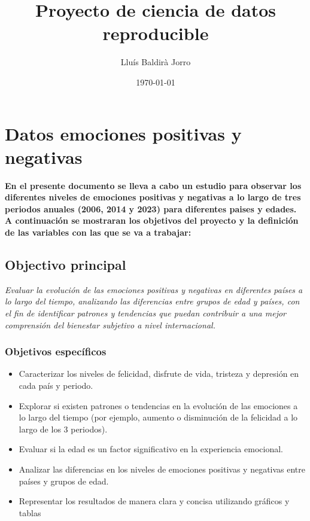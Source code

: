 \documentclass{article}
\title{Proyecto de ciencia de datos reproducible}
\author{Lluís Baldirà Jorro}
\date{\today}
\begin{document}



\maketitle

\section*{Datos emociones positivas y negativas}
\textbf{En el presente documento se lleva a cabo un estudio para observar los diferentes niveles de emociones positivas y negativas a lo largo de tres periodos anuales (2006, 2014 y 2023) para diferentes paises y edades. A continuación se mostraran los objetivos del proyecto y la definición de las variables con las que se va a trabajar:}
\subsection*{Objectivo principal}
\emph{Evaluar la evolución de las emociones positivas y negativas en diferentes países a lo largo del tiempo, analizando las diferencias entre grupos de edad y países, con el fin de identificar patrones y tendencias que puedan contribuir a una mejor comprensión del bienestar subjetivo a nivel internacional.}
\subsubsection*{Objetivos específicos}
\begin{itemize}
\item Caracterizar los niveles de felicidad, disfrute de vida, tristeza y depresión en cada país y periodo.
\item Explorar si existen patrones o tendencias en la evolución de las emociones a lo largo del tiempo (por ejemplo, aumento o disminución de la felicidad a lo largo de los 3 periodos).
\item Evaluar si la edad es un factor significativo en la experiencia emocional.
\item Analizar las diferencias en los niveles de emociones positivas y negativas entre países y grupos de edad.
\item Representar los resultados de manera clara y concisa utilizando gráficos y tablas
\end{itemize}
\end{document}
